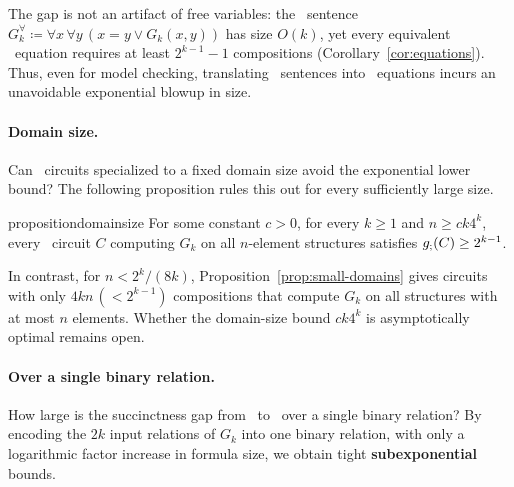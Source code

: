 The gap is not an artifact of free variables: the \FOthree\ sentence
$G_k^\forall\coloneqq\forall x\,\forall y\,(x=y\lor G_k(x,y))$
has size $O(k)$, yet every equivalent \CoR\ equation requires at
least $2^{k-1}-1$ compositions (Corollary~\ref{cor:equations}).
Thus, even for model checking, translating \FOthree\ sentences into \CoR\ equations incurs an unavoidable exponential blowup in size.

\paragraph{Domain size.}
Can \CoR\ circuits specialized to a fixed domain size avoid the exponential lower bound?
The following proposition rules this out for every sufficiently large size.

\begin{restatable}{proposition}{domainsize}\label{prop:domain-size}
For some constant $c>0$, for every $k\ge1$
and $n\ge ck4^k$, every \CoR\ circuit $C$
computing $G_k$ on all $n$-element structures
satisfies $g_{;}(C) \geq 2^{k-1}$.
\end{restatable}

In contrast, for $n<2^k/(8k)$, Proposition~\ref{prop:small-domains} gives
circuits with only $4kn\,(< 2^{k-1})$ compositions
that compute $G_k$ on all structures with at most $n$ elements.
Whether the domain-size bound $ck4^k$ is
asymptotically optimal remains open.

\paragraph{Over a single binary relation.}
How large is the succinctness gap from \FOthree\ to \CoR\ over a single binary relation? By encoding the $2k$ input relations of $G_k$ into one binary relation,
with only a logarithmic factor increase in formula size, we obtain tight \textbf{subexponential} bounds.

